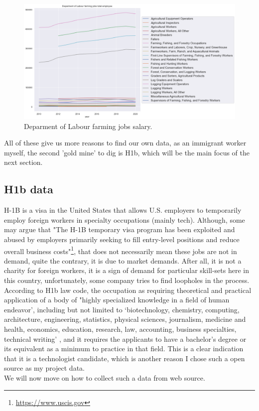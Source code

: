 \begin{figure}[h]
	\begin{center}
		\includegraphics[width=\linewidth]{./photos/dolfarmingsalary.png}
	\end{center}
	\caption{Deparment of Labour farming jobs salary.}
	\label{dolfarmingsalary}
\end{figure}
All of these give us more reasons to find our own data, as an immigrant worker myself, the second 'gold mine' to dig is H1b, which will be the main focus of the next section.
\subsection{H1b data}
 H-1B is a visa in the United States  that allows U.S. employers to temporarily employ foreign workers in specialty occupations (mainly tech). Although, some may argue that "The H-1B temporary visa program has been exploited and abused by employers primarily seeking to fill entry-level positions and reduce overall business costs"\footnote{\url{https://www.uscis.gov}}, that does not necessarily mean these jobs are not in demand, quite the contrary, it is due to market demands. After all, it is not a charity for foreign workers, it is a sign of demand for particular skill-sets here in this country, unfortunately, some company tries to find loopholes in the process. \\
According to H1b law code, the  occupation as requiring theoretical and practical application of a body of "highly specialized knowledge in a field of human endeavor', including but not limited to `biotechnology, chemistry, computing, architecture, engineering, statistics, physical sciences, journalism, medicine and health, economics, education, research, law, accounting, business specialties, technical writing' , and it requires the applicants to have  a bachelor's degree or its equivalent as a minimum to practice in that field. This is a clear indication that it is a technologist candidate, which is another reason I chose such a open source as my project data.\\
We will now move on how to collect such a data from web source.
